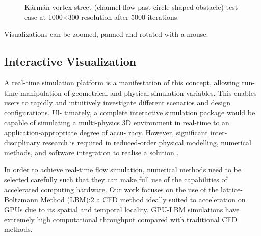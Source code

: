 \begin{figure}[!ht]
	\centering
	 \par
	\caption{Kármán vortex street (channel flow past circle-shaped obstacle) test case at 1000$\times$300 resolution after 5000 iterations.}
	\label{fig:d2q9_channel}
\end{figure}

Visualizations can be zoomed, panned and rotated with a mouse.

\subsection{Interactive Visualization}
\label{interactive-simulation}

A real-time simulation platform is a manifestation of this concept, allowing run-time manipulation of geometrical and physical simulation variables. This enables users to rapidly and intuitively investigate different scenarios and design configurations. Ul- timately, a complete interactive simulation package would be capable of simulating a multi-physics 3D environment in real-time to an application-appropriate degree of accu- racy. However, significant inter-disciplinary research is required in reduced-order physical modelling, numerical methods, and software integration to realise a solution \citep{harwoodREALTIMEMODELLINGSIMULATION}.

In order to achieve real-time flow simulation, numerical methods need to be selected carefully such that they can make full use of the capabilities of accelerated computing hardware. Our work focuses on the use of the lattice-Boltzmann Method (LBM):2 a CFD method ideally suited to acceleration on GPUs due to its spatial and temporal locality. GPU-LBM simulations have extremely high computational throughput compared with traditional CFD methods.

